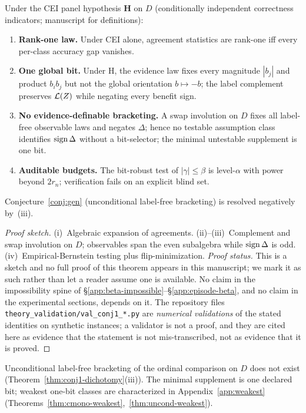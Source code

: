\begin{theorem}\label{thm:conj1-dichotomy}
Under the CEI panel hypothesis \textbf{H} on $D$ (conditionally independent correctness
indicators; manuscript for definitions):
\begin{enumerate}
\item[\textnormal{(i)}] \textbf{Rank-one law.} Under CEI alone, agreement statistics are
rank-one iff every per-class accuracy gap vanishes.
\item[\textnormal{(ii)}] \textbf{One global bit.} Under H, the evidence law fixes every
magnitude $|b_j|$ and product $b_ib_j$ but not the global orientation $b\mapsto -b$; the label
complement preserves $\mathcal{L}(Z)$ while negating every benefit sign.
\item[\textnormal{(iii)}] \textbf{No evidence-definable bracketing.} A swap involution on $D$
fixes all label-free observable laws and negates $\Delta$; hence no testable assumption class
identifies $\operatorname{sign}\Delta$ without a bit-selector; the minimal untestable supplement is one bit.
\item[\textnormal{(iv)}] \textbf{Auditable budgets.} The bit-robust test of $|\gamma|\le\beta$
is level-$\alpha$ with power beyond $2r_n$; verification fails on an explicit blind set.
\end{enumerate}
Conjecture~\ref{conj:gen} (unconditional label-free bracketing) is resolved negatively by~(iii).
\end{theorem}
\begin{proof}[Proof sketch]
(i)~Algebraic expansion of agreements. (ii)--(iii)~Complement and swap involution on $D$;
observables span the even subalgebra while $\operatorname{sign}\Delta$ is odd. (iv)~Empirical-Bernstein
testing plus flip-minimization.
\emph{Proof status.} This is a sketch and no full proof of this theorem appears in this
manuscript; we mark it as such rather than let a reader assume one is available. No claim in
the impossibility spine of \S\ref{app:beta-impossible}--\S\ref{app:episode-beta}, and no claim
in the experimental sections, depends on it. The repository files
\texttt{theory\_validation/val\_conj1\_*.py} are \emph{numerical validations} of the stated
identities on synthetic instances; a validator is not a proof, and they are cited here as
evidence that the statement is not mis-transcribed, not as evidence that it is proved.
\end{proof}

\begin{conjecture}\label{conj:gen}
Unconditional label-free bracketing of the ordinal comparison on $D$ does not exist
(Theorem~\ref{thm:conj1-dichotomy}(iii)). The minimal supplement is one declared bit; weakest
one-bit classes are characterized in Appendix~\ref{app:weakest}
(Theorems~\ref{thm:cmono-weakest},~\ref{thm:uncond-weakest}).
\end{conjecture}

